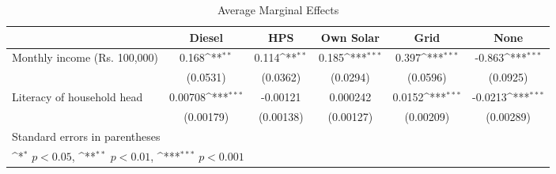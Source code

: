 \begin{table}[htbp]\centering
\def\sym#1{\ifmmode^{#1}\else\(^{#1}\)\fi}
\caption{Average Marginal Effects}
\begin{tabular}{l*{5}{c}}
\toprule
                    &\multicolumn{1}{c}{Diesel}&\multicolumn{1}{c}{HPS}&\multicolumn{1}{c}{Own Solar}&\multicolumn{1}{c}{Grid}&\multicolumn{1}{c}{None}\\
\midrule
Monthly income (Rs. 100,000)&       0.168\sym{**} &       0.114\sym{**} &       0.185\sym{***}&       0.397\sym{***}&      -0.863\sym{***}\\
                    &    (0.0531)         &    (0.0362)         &    (0.0294)         &    (0.0596)         &    (0.0925)         \\
\addlinespace
Literacy of household head&     0.00708\sym{***}&    -0.00121         &    0.000242         &      0.0152\sym{***}&     -0.0213\sym{***}\\
                    &   (0.00179)         &   (0.00138)         &   (0.00127)         &   (0.00209)         &   (0.00289)         \\
\bottomrule
\multicolumn{6}{l}{\footnotesize Standard errors in parentheses}\\
\multicolumn{6}{l}{\footnotesize \sym{*} \(p<0.05\), \sym{**} \(p<0.01\), \sym{***} \(p<0.001\)}\\
\end{tabular}
\end{table}
